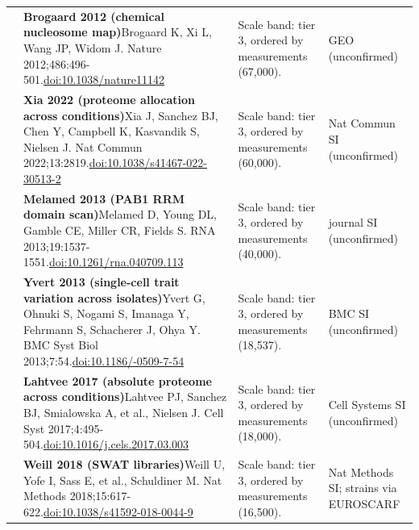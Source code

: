 \begin{landscape}
\begin{longtable}{@{}r@{\hspace{4pt}} L{86mm} L{92mm} L{62mm}@{}}
 & \textbf{Brogaard 2012 (chemical nucleosome map)}\newline Brogaard K, Xi L, Wang JP, Widom J. Nature 2012;486:496-501.\newline \href{https://doi.org/10.1038/nature11142}{doi:10.1038/\allowbreak nature11142} & Scale band: tier 3, ordered by measurements (67,000). & GEO (unconfirmed) \\
 & \textbf{Xia 2022 (proteome allocation across conditions)}\newline Xia J, Sanchez BJ, Chen Y, Campbell K, Kasvandik S, Nielsen J. Nat Commun 2022;13:2819.\newline \href{https://doi.org/10.1038/s41467-022-30513-2}{doi:10.1038/\allowbreak s41467-022-30513-2} & Scale band: tier 3, ordered by measurements (60,000). & Nat Commun SI (unconfirmed) \\
 & \textbf{Melamed 2013 (PAB1 RRM domain scan)}\newline Melamed D, Young DL, Gamble CE, Miller CR, Fields S. RNA 2013;19:1537-1551.\newline \href{https://doi.org/10.1261/rna.040709.113}{doi:10.1261/\allowbreak rna.040709.113} & Scale band: tier 3, ordered by measurements (40,000). & journal SI (unconfirmed) \\
 & \textbf{Yvert 2013 (single-cell trait variation across isolates)}\newline Yvert G, Ohnuki S, Nogami S, Imanaga Y, Fehrmann S, Schacherer J, Ohya Y. BMC Syst Biol 2013;7:54.\newline \href{https://doi.org/10.1186/1752-0509-7-54}{doi:10.1186/-0509-7-54} & Scale band: tier 3, ordered by measurements (18,537). & BMC SI (unconfirmed) \\
 & \textbf{Lahtvee 2017 (absolute proteome across conditions)}\newline Lahtvee PJ, Sanchez BJ, Smialowska A, et al., Nielsen J. Cell Syst 2017;4:495-504.\newline \href{https://doi.org/10.1016/j.cels.2017.03.003}{doi:10.1016/\allowbreak j.cels.2017.03.003} & Scale band: tier 3, ordered by measurements (18,000). & Cell Systems SI (unconfirmed) \\
 & \textbf{Weill 2018 (SWAT libraries)}\newline Weill U, Yofe I, Sass E, et al., Schuldiner M. Nat Methods 2018;15:617-622.\newline \href{https://doi.org/10.1038/s41592-018-0044-9}{doi:10.1038/\allowbreak s41592-018-0044-9} & Scale band: tier 3, ordered by measurements (16,500). & Nat Methods SI; strains via EUROSCARF \\

\end{longtable}
\end{landscape}
